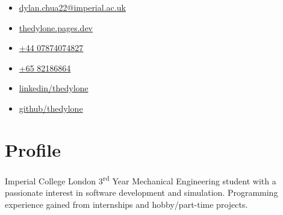 \documentclass{cv}
\begin{document}
\begin{minipage}[h]{.33\textwidth-0.33\margin}
    \begin{itemize}
        \setlength{\itemsep}{0.5em}
        \item[\Large\faAt] \href{mailto:dylan.chua22@imperial.ac.uk}{dylan.chua22@imperial.ac.uk}
        \item[\Large\faLaptop] \href{https://thedylone.pages.dev}{thedylone.pages.dev}
    \end{itemize}
\end{minipage}
\hfill
\begin{minipage}[h]{.33\textwidth-0.33\margin}
    \vspace{0.5em}
    \begin{itemize}
        \centering
        \setlength{\itemsep}{0.5em}
        \item[\Large\faMobile] \href{tel:4407874074827}{+44 07874074827}
        \item[\Large\faMobile] \href{tel:6582186864}{+65 82186864}
    \end{itemize}
\end{minipage}
\hfill
\begin{minipage}[h]{.33\textwidth-0.33\margin}
    \vspace{0.5em}
    \begin{itemize}
        \raggedleft
        \setlength{\itemsep}{0.5em}
        \item[\Large\faLinkedinSquare] \href{https://www.linkedin.com/in/thedylone/}{linkedin/thedylone}
        \item[\Large\faGithub] \href{https://github.com/thedylone}{github/thedylone}
    \end{itemize}
\end{minipage}

\section{Profile}
\raggedright
Imperial College London 3\textsuperscript{rd} Year Mechanical Engineering student with a passionate interest in software development and simulation. Programming experience gained from internships and hobby/part-time projects.
\end{document}
